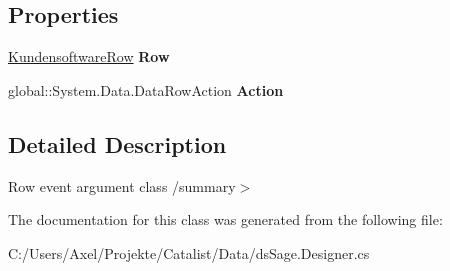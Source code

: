 \subsection*{Properties}
\begin{DoxyCompactItemize}
\item 
\hyperlink{class_products_1_1_data_1_1ds_sage_1_1_kundensoftware_row}{Kundensoftware\+Row} {\bfseries Row}\hypertarget{class_products_1_1_data_1_1ds_sage_1_1_kundensoftware_row_change_event_ac029c1031c4da1b86304a1631bc936fd}{}\label{class_products_1_1_data_1_1ds_sage_1_1_kundensoftware_row_change_event_ac029c1031c4da1b86304a1631bc936fd}

\item 
global\+::\+System.\+Data.\+Data\+Row\+Action {\bfseries Action}\hypertarget{class_products_1_1_data_1_1ds_sage_1_1_kundensoftware_row_change_event_a1ecf924490951dd8393ab27078974d6b}{}\label{class_products_1_1_data_1_1ds_sage_1_1_kundensoftware_row_change_event_a1ecf924490951dd8393ab27078974d6b}

\end{DoxyCompactItemize}


\subsection{Detailed Description}
Row event argument class /summary$>$ 

The documentation for this class was generated from the following file\+:\begin{DoxyCompactItemize}
\item 
C\+:/\+Users/\+Axel/\+Projekte/\+Catalist/\+Data/ds\+Sage.\+Designer.\+cs\end{DoxyCompactItemize}
